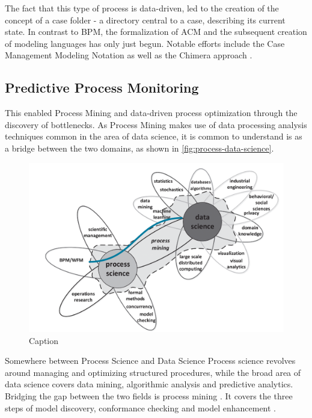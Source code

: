 The fact that this type of process is data-driven, led to the creation of the concept of a case folder - a directory central to a case, describing its current state. In contrast to BPM, the formalization of ACM and the subsequent creation of modeling languages has only just begun. Notable efforts include the Case Management Modeling Notation \cite{web:cmmn} as well as the Chimera approach \cite{hewelt2016}.



\subsection{Predictive Process Monitoring}
This enabled Process Mining and data-driven process optimization through the discovery of bottlenecks.
As Process Mining makes use of data processing analysis techniques common in the area of data science, it is common to understand is as a bridge between the two domains, as shown in \autoref{fig:process-data-science}.
\begin{figure}
    \centering
    \includegraphics[width=\textwidth]{gfx/process-data-science.png}
    \caption{Caption}
    \label{fig:process-data-science}
\end{figure}

Somewhere between Process Science and Data Science
Process science revolves around managing and optimizing structured procedures, while the broad area of data science covers data mining, algorithmic analysis and predictive analytics. 
Bridging the gap between the two fields is process mining \cite[p.18]{Aalst16}.
It covers the three steps of model discovery, conformance checking and model enhancement \cite{Aalst16}.

